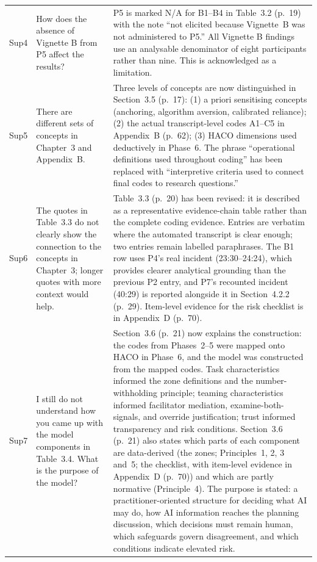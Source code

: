 \documentclass[12pt,a4paper,twoside]{article}
\begin{document}
{\begin{longtable}{p{1cm}p{6.7cm}p{7cm}}
Sup4 &
How does the absence of Vignette B from P5 affect the results? &
P5 is marked N/A for B1--B4 in Table~3.2 (p.~19) with the note ``not elicited because Vignette~B was not administered to P5.'' All Vignette B findings use an analysable denominator of eight participants rather than nine. This is acknowledged as a limitation. \\

Sup5 &
There are different sets of concepts in Chapter~3 and Appendix~B. &
Three levels of concepts are now distinguished in Section~3.5 (p.~17): (1) a priori
sensitising concepts (anchoring, algorithm aversion, calibrated reliance); (2) the
actual transcript-level codes A1--C5 in Appendix~B (p.~62); (3) HACO dimensions used
deductively in Phase~6. The phrase ``operational definitions used throughout coding''
has been replaced with ``interpretive criteria used to connect final codes to research
questions.'' \\

Sup6 &
The quotes in Table~3.3 do not clearly show the connection to the concepts in
Chapter~3; longer quotes with more context would help. &
Table~3.3 (p.~20) has been revised: it is described as a representative evidence-chain table rather than the complete coding evidence. Entries are verbatim where the automated transcript is clear enough; two entries remain labelled paraphrases. The B1 row uses P4's real incident (23:30--24:24), which provides clearer analytical grounding than the previous P2 entry, and P7's recounted incident (40:29) is reported alongside it in Section~4.2.2 (p.~29). Item-level evidence for the risk checklist is in Appendix~D (p.~70). \\

Sup7 &
I still do not understand how you came up with the model components in Table~3.4.
What is the purpose of the model? &
Section~3.6 (p.~21) now explains the construction: the codes from Phases~2--5 were mapped onto HACO in Phase~6, and the model was constructed from the mapped codes. Task characteristics informed the zone definitions and the number-withholding principle; teaming characteristics informed facilitator mediation, examine-both-signals, and override justification; trust informed transparency and risk conditions. Section~3.6 (p.~21) also states which parts of each component are data-derived (the zones; Principles~1, 2, 3 and~5; the checklist, with item-level evidence in Appendix~D (p.~70)) and which are partly normative (Principle~4). The purpose is stated: a practitioner-oriented structure for deciding what AI may do, how AI information reaches the planning discussion, which decisions must remain human, which safeguards govern disagreement, and which conditions indicate elevated risk. \\


\end{longtable}}
\end{document}
